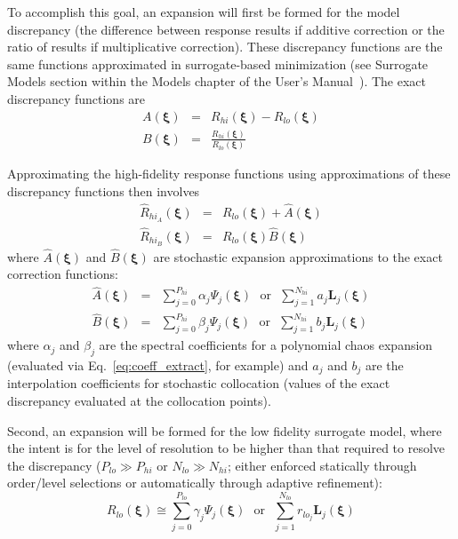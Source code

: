 To accomplish this goal, an expansion will first be formed for the
model discrepancy (the difference between response results if additive
correction or the ratio of results if multiplicative correction).
These discrepancy functions are the same functions approximated in
surrogate-based minimization (see Surrogate Models section within the
Models chapter of the User's Manual~\cite{UsersMan}).  The exact
discrepancy functions are
\begin{eqnarray}
A(\boldsymbol{\xi}) & = & R_{hi}(\boldsymbol{\xi}) - R_{lo}(\boldsymbol{\xi})
\label{eq:exact_A} \\
B(\boldsymbol{\xi}) & = & 
\frac{R_{hi}(\boldsymbol{\xi})}{R_{lo}(\boldsymbol{\xi})} \label{eq:exact_B}
\end{eqnarray}

Approximating the high-fidelity response functions using approximations of
these discrepancy functions then involves
\begin{eqnarray}
\hat{R}_{hi_A}(\boldsymbol{\xi}) & = & R_{lo}(\boldsymbol{\xi}) + 
\hat{A}(\boldsymbol{\xi}) \label{eq:correct_val_add} \\
\hat{R}_{hi_B}(\boldsymbol{\xi}) & = & 
R_{lo}(\boldsymbol{\xi}) \hat{B}(\boldsymbol{\xi}) \label{eq:correct_val_mult}
\end{eqnarray}
where $\hat{A}(\boldsymbol{\xi})$ and $\hat{B}(\boldsymbol{\xi})$ are 
stochastic expansion approximations to the exact correction functions:
\begin{eqnarray}
\hat{A}(\boldsymbol{\xi}) & = & 
\sum_{j=0}^{P_{hi}} \alpha_j \Psi_j(\boldsymbol{\xi}) ~~~\text{or}~~~ 
\sum_{j=1}^{N_{hi}} a_j \boldsymbol{L}_j(\boldsymbol{\xi}) \label{eq:stoch_exp_A} \\
\hat{B}(\boldsymbol{\xi}) & = &  
\sum_{j=0}^{P_{hi}} \beta_j \Psi_j(\boldsymbol{\xi}) ~~~\text{or}~~~ 
\sum_{j=1}^{N_{hi}} b_j \boldsymbol{L}_j(\boldsymbol{\xi}) \label{eq:stoch_exp_B}
\end{eqnarray}
where $\alpha_j$ and $\beta_j$ are the spectral coefficients for a
polynomial chaos expansion (evaluated via Eq.~\ref{eq:coeff_extract},
for example) and $a_j$ and $b_j$ are the interpolation coefficients
for stochastic collocation (values of the exact discrepancy evaluated
at the collocation points).

Second, an expansion will be formed for the low fidelity surrogate
model, where the intent is for the level of resolution to be higher
than that required to resolve the discrepancy ($P_{lo} \gg P_{hi}$ or
$N_{lo} \gg N_{hi}$; either enforced statically through order/level
selections or automatically through adaptive refinement):
\begin{equation}
R_{lo}(\boldsymbol{\xi}) \cong
\sum_{j=0}^{P_{lo}} \gamma_j \Psi_j(\boldsymbol{\xi}) ~~~\text{or}~~~ 
\sum_{j=1}^{N_{lo}} r_{lo_j} \boldsymbol{L}_j(\boldsymbol{\xi}) 
\label{eq:stoch_exp_LF}
\end{equation}

